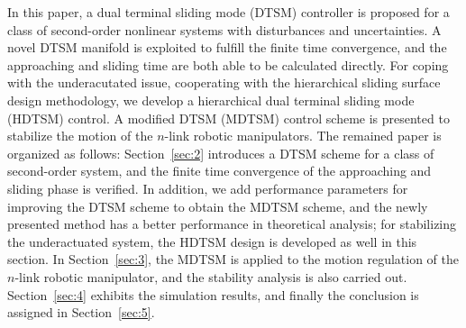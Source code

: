 \documentclass[3p]{elsarticle}
\theoremstyle{plain}
\theoremstyle{remark}
\begin{document}
In this paper, a dual terminal sliding mode (DTSM) controller is proposed for a class of second-order nonlinear systems with disturbances and uncertainties. A novel DTSM manifold is exploited to fulfill the finite time convergence, and the approaching and sliding time are both able to be calculated directly. For coping with the underacutated issue, cooperating with the hierarchical sliding surface design methodology, we develop a hierarchical dual terminal sliding mode (HDTSM) control. A modified DTSM (MDTSM) control scheme is presented to stabilize the motion of the $n$-link robotic manipulators. The remained paper is organized as follows: Section~\ref{sec:2} introduces a DTSM scheme for a class of second-order system, and the finite time convergence of the approaching and sliding phase is verified. In addition, we add performance parameters for improving the DTSM scheme to obtain the MDTSM scheme, and the newly presented method has a better performance in theoretical analysis; for stabilizing the underactuated system, the HDTSM design is developed as well in this section. In Section~\ref{sec:3}, the MDTSM is applied to the motion regulation of the $n$-link robotic  manipulator, and the stability analysis is also carried out. Section~\ref{sec:4} exhibits the simulation results, and finally the conclusion is assigned in Section~\ref{sec:5}.
\end{document}
